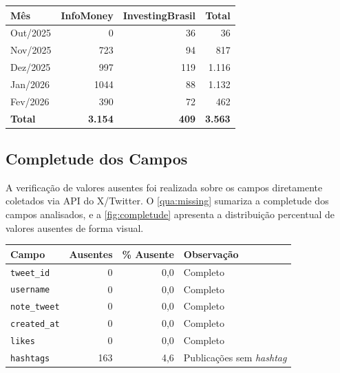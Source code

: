 \begin{quadro}[!htb]
	\centering
	\caption{\label{qua:dist_mensal}Distribuição mensal das publicações por veículo}
	\begin{tabular}{|l|r|r|r|}
		\hline
		\textbf{Mês}     & \textbf{InfoMoney} & \textbf{InvestingBrasil} & \textbf{Total} \\
		\hline
		Out/2025  &    0 &  36 &    36 \\
		Nov/2025  &  723 &  94 &   817 \\
		Dez/2025  &  997 & 119 & 1.116 \\
		Jan/2026  & 1044 &  88 & 1.132 \\
		Fev/2026  &  390 &  72 &   462 \\
		\hline
		\textbf{Total} & \textbf{3.154} & \textbf{409} & \textbf{3.563} \\
		\hline
	\end{tabular}
\end{quadro}

 
\subsection{Completude dos Campos}
\label{subsec:completude}

A verificação de valores ausentes foi realizada sobre os campos diretamente coletados via API do X/Twitter. O \autoref{qua:missing} sumariza a completude dos campos analisados, e a \autoref{fig:completude} apresenta a distribuição percentual de valores ausentes de forma visual.

\begin{quadro}[!htb]
	\centering
	\caption{\label{qua:missing}Completude dos campos coletados via API}
	\begin{tabular}{|l|r|r|l|}
		\hline
		\textbf{Campo} & \textbf{Ausentes} & \textbf{\% Ausente} &
		\textbf{Observação} \\
		\hline
		\texttt{tweet\_id}   &   0 & 0,0 & Completo \\
		\texttt{username}    &   0 & 0,0 & Completo \\
		\texttt{note\_tweet} &   0 & 0,0 & Completo \\
		\texttt{created\_at} &   0 & 0,0 & Completo \\
		\texttt{likes}       &   0 & 0,0 & Completo \\
		\texttt{hashtags}    & 163 & 4,6 & Publicações sem \textit{hashtag} \\
		\hline
	\end{tabular}
\end{quadro}


